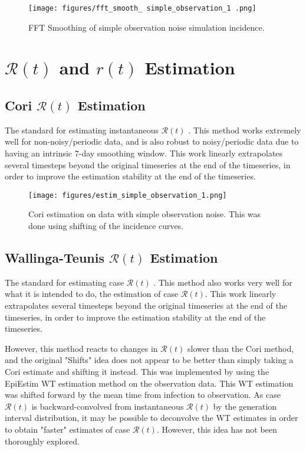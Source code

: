 \documentclass{article}
\newcommand{\nR}{\mathscr{R}}
\begin{document}
\clearpage
\begin{figure}[h!]
    \centering
    \texttt{[image: figures/fft\_smooth\_ simple\_observation\_1 .png]}
    \caption{FFT Smoothing of simple observation noise simulation incidence.}
\end{figure}

\section {$\nR(t)$ and $r(t)$ Estimation}
\subsection{Cori $\nR(t)$ Estimation}
The standard for estimating instantaneous $\nR(t)$ \cite{Cori}. This method works extremely well for non-noisy/periodic data, and is also robust to noisy/periodic data due to having an intrinsic 7-day smoothing window. This work linearly extrapolates several timesteps beyond  the original timeseries at the end of the timeseries, in order to improve the estimation stability at the end of the timeseries.

\clearpage
\begin{figure}[h!]
    \centering
    \texttt{[image: figures/estim\_simple\_observation\_1.png]}
    \caption{Cori estimation on data with simple observation noise. This was done using shifting of the incidence curves.}
\end{figure}


\subsection{Wallinga-Teunis $\nR(t)$ Estimation}
The standard for estimating case $\nR(t)$ \cite{WallingaTeunis}. This method also works very well for what it is intended to do, the estimation of case $\nR(t)$. This work linearly extrapolates several timesteps beyond  the original timeseries at the end of the timeseries, in order to improve the estimation stability at the end of the timeseries.

However, this method reacts to changes in $\nR(t)$ slower than the Cori method, and the original "Shifts" idea does not appear to be better than simply taking a Cori estimate and shifting it instead. This was implemented by using the EpiEstim WT estimation method on the observation data. This WT estimation was shifted forward by the mean time from infection to observation. As case $\nR(t)$  is backward-convolved from instantaneous $\nR(t)$ by the generation interval distribution, it may be possible to deconvolve the WT estimates in order to obtain "faster" estimates of case $\nR(t)$. However, this idea has not been thoroughly explored.
\end{document}
